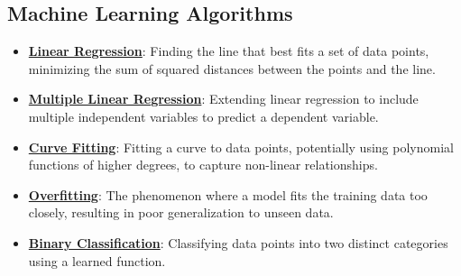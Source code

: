 \documentclass{article}%
\begin{document}
\subsection{Machine Learning Algorithms}%
\label{subsec:MachineLearningAlgorithms}%
\begin{itemize}[leftmargin=*]%
\item \href{https://purdue.brightspace.com/d2l/common/assets/pdfjs-d2l-dist/1.0.14-legacy/web/viewer.html?file=\%2Fcontent\%2Fenforced\%2F1095467-wl.202510.CS.24300.001\%2F05L2-ML Basics.pdf\%3Fou\%3D1095467\&lang=en-us\&container=d2l-fileviewer-rendered-pdf\&fullscreen=d2l-fileviewer-rendered-pdf-dialog\&height=667#page=6}{\textbf{Linear Regression}}: Finding the line that best fits a set of data points, minimizing the sum of squared distances between the points and the line.%
\item \href{https://purdue.brightspace.com/d2l/common/assets/pdfjs-d2l-dist/1.0.14-legacy/web/viewer.html?file=\%2Fcontent\%2Fenforced\%2F1095467-wl.202510.CS.24300.001\%2F05L2-ML Basics.pdf\%3Fou\%3D1095467\&lang=en-us\&container=d2l-fileviewer-rendered-pdf\&fullscreen=d2l-fileviewer-rendered-pdf-dialog\&height=667#page=11}{\textbf{Multiple Linear Regression}}: Extending linear regression to include multiple independent variables to predict a dependent variable.%
\item \href{https://purdue.brightspace.com/d2l/common/assets/pdfjs-d2l-dist/1.0.14-legacy/web/viewer.html?file=\%2Fcontent\%2Fenforced\%2F1095467-wl.202510.CS.24300.001\%2F05L2-ML Basics.pdf\%3Fou\%3D1095467\&lang=en-us\&container=d2l-fileviewer-rendered-pdf\&fullscreen=d2l-fileviewer-rendered-pdf-dialog\&height=667#page=13}{\textbf{Curve Fitting}}: Fitting a curve to data points, potentially using polynomial functions of higher degrees, to capture non{-}linear relationships.%
\item \href{https://purdue.brightspace.com/d2l/common/assets/pdfjs-d2l-dist/1.0.14-legacy/web/viewer.html?file=\%2Fcontent\%2Fenforced\%2F1095467-wl.202510.CS.24300.001\%2F05L2-ML Basics.pdf\%3Fou\%3D1095467\&lang=en-us\&container=d2l-fileviewer-rendered-pdf\&fullscreen=d2l-fileviewer-rendered-pdf-dialog\&height=667#page=14}{\textbf{Overfitting}}: The phenomenon where a model fits the training data too closely, resulting in poor generalization to unseen data.%
\item \href{https://purdue.brightspace.com/d2l/common/assets/pdfjs-d2l-dist/1.0.14-legacy/web/viewer.html?file=\%2Fcontent\%2Fenforced\%2F1095467-wl.202510.CS.24300.001\%2F05L2-ML Basics.pdf\%3Fou\%3D1095467\&lang=en-us\&container=d2l-fileviewer-rendered-pdf\&fullscreen=d2l-fileviewer-rendered-pdf-dialog\&height=667#page=20}{\textbf{Binary Classification}}: Classifying data points into two distinct categories using a learned function.%

\end{itemize}
\end{document}
